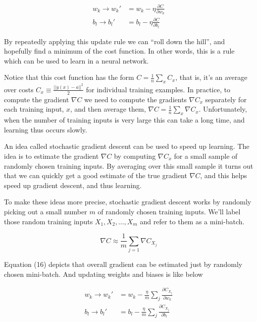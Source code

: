 \documentclass[12 pt]{article}
\begin{document}
\begin{equation}
    \begin{split}
        w_k \to w_k' &= w_k − \eta \frac{\partial C}{\partial w_k} \\
        b_l \to b_l' &= b_l − \eta \frac{\partial C}{\partial b_l}
    \end{split}
\end{equation}

By repeatedly applying this update rule we can ``roll down the hill'',
and hopefully find a minimum of the cost function. In other words, this
is a rule which can be used to learn in a neural network.

Notice that this cost function has the form $ C = \frac{1}{n}
\sum_x C_x $, that is, it's an average over costs $ C_x \equiv
\frac{||y(x) - a|| ^ 2}{2} $ for individual training examples. In
practice, to compute the gradient $ \nabla C $ we need to compute the
gradients $ \nabla C_x $ separately for each training input,
$ x $, and then average them, $ \nabla C = \frac{1}{n} \sum_x
\nabla C_x $. Unfortunately, when the number of training inputs is very
large this can take a long time, and learning thus occurs slowly.

An idea called stochastic gradient descent can be used to speed up
learning. The idea is to estimate the gradient $ \nabla C $ by
computing $ \nabla C_x $ for a small sample of randomly chosen
training inputs. By averaging over this small sample it turns out that
we can quickly get a good estimate of the true gradient $ \nabla C $,
and this helps speed up gradient descent, and thus learning.

To make these ideas more precise, stochastic gradient descent works by
randomly picking out a small number $ m $ of randomly chosen training
inputs. We'll label those random training inputs $ X_1, X_2,\ldots{},
X_m $ and refer to them as a mini-batch.

\begin{equation}
    \nabla C \approx \frac{1}{m} \sum_{j = 1} \nabla C_{X_j}
\end{equation}

Equation (16) depicts that overall gradient can be estimated just by
randomly chosen mini-batch. And updating weights and biases is like
below

\begin{equation}
    \begin{split}
        w_k \to w_k' &= w_k − \frac{\eta}{m} \sum_j \frac{\partial C_{X_j}}
        {\partial w_k} \\
        b_l \to b_l' &= b_l − \frac{\eta}{m} \sum_j \frac{\partial C_{X_j}}
        {\partial b_l}
    \end{split}
\end{equation}
\end{document}
